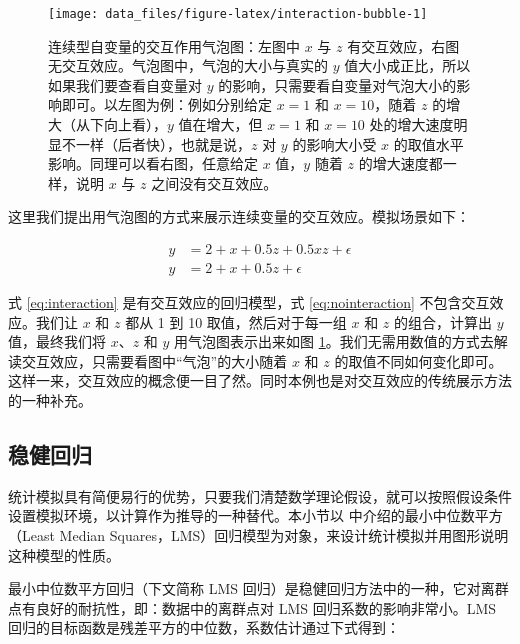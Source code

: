 \documentclass[
  b5paper,
  UTF8,twoside]{book}
\begin{document}
\begin{figure}

{\centering \texttt{[image: data\_files/figure-latex/interaction-bubble-1]} 

}

\caption[连续型自变量的交互作用气泡图]{连续型自变量的交互作用气泡图：左图中 \(x\) 与 \(z\) 有交互效应，右图无交互效应。气泡图中，气泡的大小与真实的 \(y\) 值大小成正比，所以如果我们要查看自变量对 \(y\) 的影响，只需要看自变量对气泡大小的影响即可。以左图为例：例如分别给定 \(x=1\) 和 \(x=10\)，随着 \(z\) 的增大（从下向上看），\(y\) 值在增大，但 \(x=1\) 和 \(x=10\) 处的增大速度明显不一样（后者快），也就是说，\(z\) 对 \(y\) 的影响大小受 \(x\) 的取值水平影响。同理可以看右图，任意给定 \(x\) 值，\(y\) 随着 \(z\) 的增大速度都一样，说明 \(x\) 与 \(z\) 之间没有交互效应。}\label{fig:interaction-bubble}
\end{figure}





这里我们提出用气泡图的方式来展示连续变量的交互效应。模拟场景如下：

\begin{align} 
y   &=  2+x+0.5z+0.5xz+\epsilon \label{eq:interaction} \\
y   &=  2+x+0.5z+\epsilon \label{eq:nointeraction}
\end{align}

式 \eqref{eq:interaction} 是有交互效应的回归模型，式 \eqref{eq:nointeraction} 不包含交互效应。我们让 \(x\) 和 \(z\) 都从 1 到 10 取值，然后对于每一组 \(x\) 和 \(z\) 的组合，计算出 \(y\) 值，最终我们将 \(x\)、\(z\) 和 \(y\) 用气泡图表示出来如图 \ref{fig:interaction-bubble}。我们无需用数值的方式去解读交互效应，只需要看图中``气泡''的大小随着 \(x\) 和 \(z\) 的取值不同如何变化即可。这样一来，交互效应的概念便一目了然。同时本例也是对交互效应的传统展示方法的一种补充。

\subsection{稳健回归}\label{ux7a33ux5065ux56deux5f52}

统计模拟具有简便易行的优势，只要我们清楚数学理论假设，就可以按照假设条件设置模拟环境，以计算作为推导的一种替代。本小节以 \citet{Venables02} 中介绍的最小中位数平方（Least Median Squares，LMS）回归模型为对象，来设计统计模拟并用图形说明这种模型的性质。

最小中位数平方回归（下文简称 LMS 回归）是稳健回归方法中的一种，它对离群点有良好的耐抗性，即：数据中的离群点对 LMS 回归系数的影响非常小。LMS 回归的目标函数是残差平方的中位数，系数估计通过下式得到：
\end{document}
